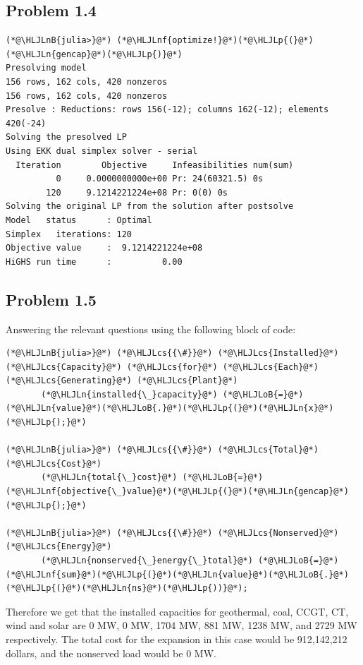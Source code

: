 \documentclass[12pt,a4paper]{article}
\newcommand{\HLJLn}[1]{#1}
\newcommand{\HLJLnf}[1]{\textcolor[RGB]{66,102,213}{#1}}
\newcommand{\HLJLnB}[1]{\textcolor[RGB]{59,151,46}{#1}}
\newcommand{\HLJLoB}[1]{\textcolor[RGB]{102,102,102}{\textbf{#1}}}
\newcommand{\HLJLp}[1]{#1}
\newcommand{\HLJLcs}[1]{\textcolor[RGB]{153,153,119}{\textit{#1}}}
\begin{document}
\subsection{Problem 1.4}

\begin{lstlisting}
(*@\HLJLnB{julia>}@*) (*@\HLJLnf{optimize!}@*)(*@\HLJLp{(}@*)(*@\HLJLn{gencap}@*)(*@\HLJLp{)}@*)
Presolving model
156 rows, 162 cols, 420 nonzeros
156 rows, 162 cols, 420 nonzeros
Presolve : Reductions: rows 156(-12); columns 162(-12); elements 420(-24)
Solving the presolved LP
Using EKK dual simplex solver - serial
  Iteration        Objective     Infeasibilities num(sum)
          0     0.0000000000e+00 Pr: 24(60321.5) 0s
        120     9.1214221224e+08 Pr: 0(0) 0s
Solving the original LP from the solution after postsolve
Model   status      : Optimal
Simplex   iterations: 120
Objective value     :  9.1214221224e+08
HiGHS run time      :          0.00
\end{lstlisting}

\subsection{Problem 1.5}
Answering the relevant questions using the following block of code:


\begin{lstlisting}
(*@\HLJLnB{julia>}@*) (*@\HLJLcs{{\#}}@*) (*@\HLJLcs{Installed}@*) (*@\HLJLcs{Capacity}@*) (*@\HLJLcs{for}@*) (*@\HLJLcs{Each}@*) (*@\HLJLcs{Generating}@*) (*@\HLJLcs{Plant}@*)
       (*@\HLJLn{installed{\_}capacity}@*) (*@\HLJLoB{=}@*) (*@\HLJLn{value}@*)(*@\HLJLoB{.}@*)(*@\HLJLp{(}@*)(*@\HLJLn{x}@*)(*@\HLJLp{);}@*)

(*@\HLJLnB{julia>}@*) (*@\HLJLcs{{\#}}@*) (*@\HLJLcs{Total}@*) (*@\HLJLcs{Cost}@*)
       (*@\HLJLn{total{\_}cost}@*) (*@\HLJLoB{=}@*) (*@\HLJLnf{objective{\_}value}@*)(*@\HLJLp{(}@*)(*@\HLJLn{gencap}@*)(*@\HLJLp{);}@*)

(*@\HLJLnB{julia>}@*) (*@\HLJLcs{{\#}}@*) (*@\HLJLcs{Nonserved}@*) (*@\HLJLcs{Energy}@*)
       (*@\HLJLn{nonserved{\_}energy{\_}total}@*) (*@\HLJLoB{=}@*) (*@\HLJLnf{sum}@*)(*@\HLJLp{(}@*)(*@\HLJLn{value}@*)(*@\HLJLoB{.}@*)(*@\HLJLp{(}@*)(*@\HLJLn{ns}@*)(*@\HLJLp{))}@*);
\end{lstlisting}

Therefore we get that the installed capacities for geothermal, coal, CCGT, CT, wind and solar are 0 MW, 0 MW, 1704 MW, 881 MW, 1238 MW, and 2729 MW respectively. The total cost for the expansion in this case would be  912,142,212 dollars, and the nonserved load would be 0 MW.
\end{document}
